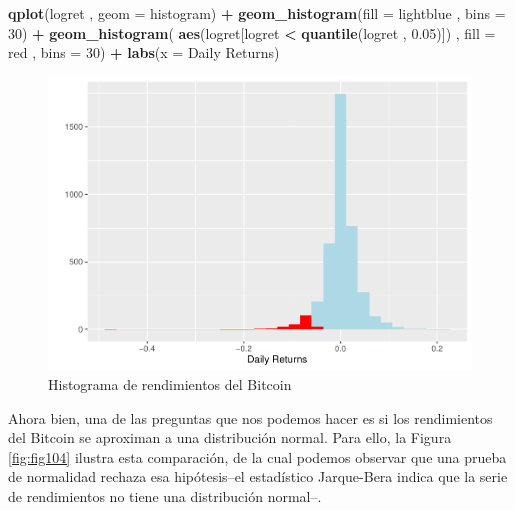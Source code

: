 \documentclass[
]{book}
\newenvironment{Shaded}{\begin{snugshade}}{\end{snugshade}}
\newcommand{\AttributeTok}[1]{\textcolor[rgb]{0.13,0.29,0.53}{#1}}
\newcommand{\DecValTok}[1]{\textcolor[rgb]{0.00,0.00,0.81}{#1}}
\newcommand{\FloatTok}[1]{\textcolor[rgb]{0.00,0.00,0.81}{#1}}
\newcommand{\FunctionTok}[1]{\textcolor[rgb]{0.13,0.29,0.53}{\textbf{#1}}}
\newcommand{\NormalTok}[1]{#1}
\newcommand{\SpecialCharTok}[1]{\textcolor[rgb]{0.81,0.36,0.00}{\textbf{#1}}}
\newcommand{\StringTok}[1]{\textcolor[rgb]{0.31,0.60,0.02}{#1}}
\begin{document}
\begin{Shaded}
\begin{Highlighting}[]
\FunctionTok{qplot}\NormalTok{(logret , }\AttributeTok{geom =} \StringTok{\textquotesingle{}histogram\textquotesingle{}}\NormalTok{) }\SpecialCharTok{+} 
  \FunctionTok{geom\_histogram}\NormalTok{(}\AttributeTok{fill =} \StringTok{\textquotesingle{}lightblue\textquotesingle{}}\NormalTok{ , }\AttributeTok{bins =} \DecValTok{30}\NormalTok{) }\SpecialCharTok{+}
  \FunctionTok{geom\_histogram}\NormalTok{( }\FunctionTok{aes}\NormalTok{(logret[logret }\SpecialCharTok{\textless{}} \FunctionTok{quantile}\NormalTok{(logret , }\FloatTok{0.05}\NormalTok{)]) , }
                  \AttributeTok{fill =} \StringTok{\textquotesingle{}red\textquotesingle{}}\NormalTok{ , }\AttributeTok{bins =} \DecValTok{30}\NormalTok{) }\SpecialCharTok{+}
  \FunctionTok{labs}\NormalTok{(}\AttributeTok{x =} \StringTok{\textquotesingle{}Daily Returns\textquotesingle{}}\NormalTok{)}
\end{Highlighting}
\end{Shaded}

\begin{figure}

{\centering \includegraphics{Notas-Series-Tiempo_files/figure-latex/fig103-1} 

}

\caption{Histograma de rendimientos del Bitcoin}\label{fig:fig103}
\end{figure}

Ahora bien, una de las preguntas que nos podemos hacer es si los rendimientos del Bitcoin se aproximan a una distribución normal. Para ello, la Figura \ref{fig:fig104} ilustra esta comparación, de la cual podemos observar que una prueba de normalidad rechaza esa hipótesis--el estadístico Jarque-Bera indica que la serie de rendimientos no tiene una distribución normal--.
\end{document}
